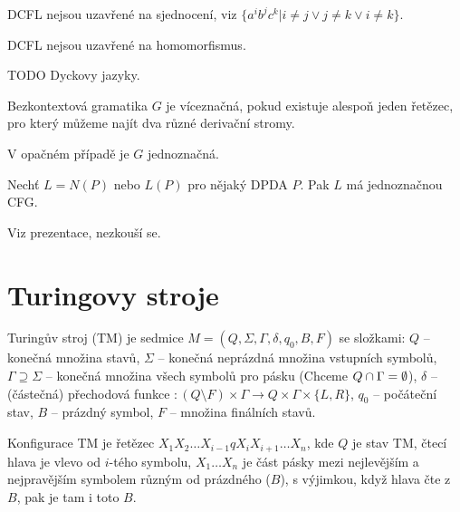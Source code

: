 \documentclass[12pt]{article}                   %
\begin{document}
    \begin{upozorneni}
        DCFL nejsou uzavřené na sjednocení, viz $\{a^ib^jc^k | i≠j \lor j≠k \lor i≠k\}$.
    \end{upozorneni}

    \begin{upozorneni}
        DCFL nejsou uzavřené na homomorfismus.
    \end{upozorneni}


    TODO Dyckovy jazyky.

    \begin{definice}
        Bezkontextová gramatika $G$ je víceznačná, pokud existuje alespoň jeden řetězec, pro který můžeme najít dva různé derivační stromy.

        V opačném případě je $G$ jednoznačná.
    \end{definice}

    \begin{veta}
        Nechť $L = N(P)$ nebo $L(P)$ pro nějaký DPDA $P$. Pak $L$ má jednoznačnou CFG.

        \begin{dukazin}
            Viz prezentace, nezkouší se.
        \end{dukazin}
    \end{veta}

\section{Turingovy stroje}
    \begin{definice}
        Turingův stroj (TM) je sedmice $M = (Q, \Sigma, \Gamma, \delta, q_0, B, F)$ se složkami: $Q$ -- konečná množina stavů, $\Sigma$ -- konečná neprázdná množina vstupních symbolů, $\Gamma \supseteq \Sigma$ -- konečná množina všech symbolů pro pásku (Chceme $Q \cap \Gamma = \emptyset$), $\delta$ -- (částečná) přechodová funkce $: (Q \setminus F) \times \Gamma \rightarrow Q \times \Gamma \times \{L, R\}$, $q_0$ -- počáteční stav, $B$ -- prázdný symbol, $F$ -- množina finálních stavů.
    \end{definice}

    \begin{definice}
        Konfigurace TM je řetězec $X_1X_2…X_{i-1}qX_iX_{i+1}…X_n$, kde $Q$ je stav TM, čtecí hlava je vlevo od $i$-tého symbolu, $X_1…X_n$ je část pásky mezi nejlevějším a nejpravějším symbolem různým od prázdného ($B$), s výjimkou, když hlava čte z $B$, pak je tam i toto $B$.
    \end{definice}
\end{document}

